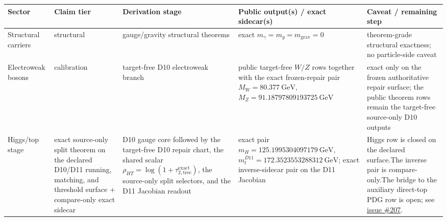 \documentclass[11pt]{article}
\begin{document}
\begin{table}[h]
\centering
\tiny
\setlength{\tabcolsep}{2pt}
\begin{tabular}{@{}>{\raggedright\arraybackslash}p{}>{\raggedright\arraybackslash}p{}>{\raggedright\arraybackslash}p{}>{\raggedright\arraybackslash}p{}>{\raggedright\arraybackslash}p{}@{}}
\toprule
Sector & Claim tier & Derivation stage & Public output(s) / exact sidecar(s) & Caveat / remaining step \\
\midrule
Structural carriers & structural & gauge/gravity structural theorems & exact \(m_\gamma=m_g=m_{\mathrm{grav}}=0\) & theorem-grade structural exactness; no particle-side caveat \\
Electroweak bosons & calibration & target-free D10 electroweak branch & public target-free \(W/Z\) rows together with the exact frozen-repair pair \(M_W=80.377~\mathrm{GeV}\), \(M_Z=91.18797809193725~\mathrm{GeV}\) & exact only on the frozen authoritative repair surface; the public theorem rows remain the target-free source-only D10 outputs \\
Higgs/top stage & exact source-only split theorem on the declared D10/D11 running, matching, and threshold surface + compare-only exact sidecar & D10 gauge core followed by the target-free D10 repair chart, the shared scalar \(\rho_{HT}=\log(1+\tau_{2,\mathrm{tree}}^{\mathrm{exact}})\), the source-only split selectors, and the D11 Jacobian readout & exact pair \(m_H=125.1995304097179~\mathrm{GeV}\), \(m_t^{D11}=172.3523553288312~\mathrm{GeV}\); exact inverse-sidecar pair on the D11 Jacobian & Higgs row is closed on the declared surface.\newline The inverse pair is compare-only.\newline The bridge to the auxiliary direct-top PDG row is open; see \href{https://github.com/FloatingPragma/observer-patch-holography/issues/207}{issue \#207}. \\

\end{tabular}
\end{table}
\end{document}
